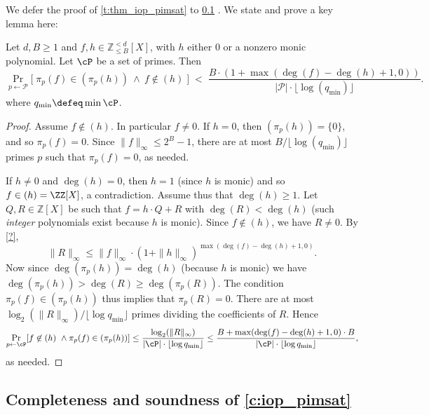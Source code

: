 We defer the proof of \cref{t:thm_iop_pimsat} to \cref{a:iop_pimsat} . We state and prove a key lemma here:
\begin{lemma}\label{lem:ideals_modular projection}
Let $d,B\ge 1$ and $f,h\in\mathbb{Z}_{\leq B}^{<d}[X]$, with $h$ either $0$ or a nonzero monic polynomial. Let $\cP$ be a set of primes. Then
%
\[
\Pr_{p\leftarrow\mathcal{P}}
\Big[\;\pi_p(f)\in (\pi_p(h))\ \wedge\ f\notin (h)\;\Big]
\;<\;\frac{B\cdot (1 +\max(\deg(f)-\deg(h)+1,0))}{|\mathcal{P}|\cdot \lfloor\log(q_{\min})\rfloor}.
\]
where $q_{\min}\defeq \min \cP$.
\end{lemma}
\begin{proof}
Assume  $f\not\in(h)$. In particular
$f\neq 0$. 
 If $h=0$, then  $(\pi_p(h))=\{0\}$, and so
 $\pi_p(f)=0$. Since $\|f\|_\infty\leq 2^{B}-1$, there are at most $B/\lfloor \log(q_{\min})\rfloor$ primes $p$ such that $\pi_p(f)=0$, as needed.

If $h\neq0$ and $\deg(h)=0$, then $h=1$ (since $h$ is monic) and so $f\in(h)=\ZZ[X]$, a contradiction. Assume thus that $\deg(h)\geq 1$. Let $Q,R\in\mathbb{Z}[X]$ be such that
$f=h\cdot Q+R$ with $\deg(R)<\deg(h)$ (such \emph{integer} polynomials exist because $h$ is monic). Since
$f\notin(h)$, we have $R\neq0$.
By \cref{?}, $$\|R\|_\infty \le\|f\|_\infty\cdot (1 +\|h\|_\infty)^{\max(\deg(f) - \deg(h) +1,0)}.$$ 
Now since $\deg(\pi_p(h))=\deg(h)$ (because $h$ is monic) we have $ \deg(\pi_p(h))> \deg(R)\geq \deg(\pi_p(R))$.  The condition $\pi_p(f)\in (\pi_p(h))$ thus implies that $\pi_p(R)=0$.  There are at most $\log_2(\|R\|_\infty)/\lfloor \log q_{\min} \rfloor$ primes dividing the coefficients of $R$. Hence
%
$$\Pr_{p\gets \cP}[f\not\in (h) \ \wedge \pi_p(f)\in (\pi_p(h))] \leq \frac{\log_2(\|R\|_\infty)}{|\cP|\cdot \lfloor \log q_{\min} \rfloor} \leq \frac{B + \max(\deg(f)-\deg(h)+1,0)\cdot B}{|\cP|\cdot \lfloor \log q_{\min}\rfloor},$$
as needed.
%
\end{proof}




\label{s:univ_skip_ideal_membership}



\subsection{Completeness and soundness of \cref{c:iop_pimsat}}\label{a:iop_pimsat}



